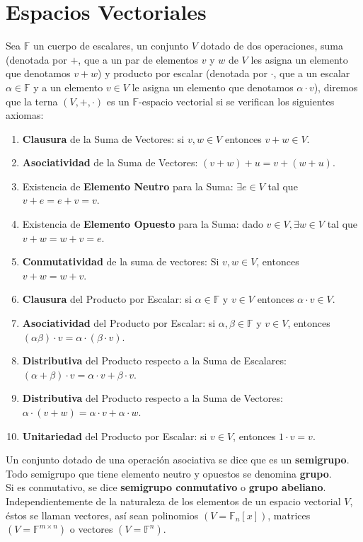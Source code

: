 \documentclass[11pt,a4paper]{article}
\begin{document}
\section{Espacios Vectoriales}
Sea $\mathbb{F}$ un cuerpo de escalares, un conjunto $V$ dotado de dos operaciones, suma (denotada por $+$, que a un par de elementos $v$ y $w$ de $V$ les asigna un elemento que denotamos $v+w$) y producto por escalar (denotada por $\cdot$, que a un escalar $\alpha \in \mathbb{F}$ y a un elemento $v \in V$ le asigna un elemento que denotamos $\alpha \cdot v$), diremos que la terna $(V, +, \cdot)$ es un $\mathbb{F}$-espacio vectorial si se verifican los siguientes axiomas:
\begin{enumerate}
\itemsep-0.3em
\item \textbf{Clausura} de la Suma de Vectores: si $v,w \in V$ entonces $v+w \in V$.
\item \textbf{Asociatividad} de la Suma de Vectores: $(v+w)+u = v+(w+u)$.
\item Existencia de \textbf{Elemento Neutro} para la Suma: $\exists e \in V$ tal que $v + e = e + v = v$.
\item Existencia de \textbf{Elemento Opuesto} para la Suma: dado $v \in V, \exists w \in V$ tal que $v + w = w + v = e$.
\item \textbf{Conmutatividad} de la suma de vectores: Si $v, w \in V$, entonces $v+w = w+v$.
\item \textbf{Clausura} del Producto por Escalar: si $\alpha \in \mathbb{F}$ y $v \in V$ entonces $\alpha \cdot v \in V$.
\item \textbf{Asociatividad} del Producto por Escalar: si $\alpha, \beta \in \mathbb{F}$ y $v \in V$, entonces $(\alpha \beta) \cdot v = \alpha \cdot (\beta \cdot v)$.
\item \textbf{Distributiva} del Producto respecto a la Suma de Escalares: $(\alpha + \beta)\cdot v = \alpha \cdot v + \beta \cdot v$.
\item \textbf{Distributiva} del Producto respecto a la Suma de Vectores: $\alpha \cdot (v + w) = \alpha \cdot v + \alpha \cdot w$.
\item \textbf{Unitariedad} del Producto por Escalar: si $v \in V$, entonces $1 \cdot v = v$.
\end{enumerate}
Un conjunto dotado de una operaci\'on asociativa se dice que es un \textbf{semigrupo}.\\ Todo semigrupo que tiene elemento neutro y opuestos se denomina \textbf{grupo}.\\ Si es conmutativo, se dice \textbf{semigrupo conmutativo} o \textbf{grupo abeliano}.\\
Independientemente de la naturaleza de los elementos de un espacio vectorial $V$, \'estos se llaman vectores, as\'i sean polinomios $(V = \mathbb{F}_n[x])$, matrices $(V = \mathbb{F}^{m \times n})$ o vectores $(V = \mathbb{F}^n)$.
\end{document}
